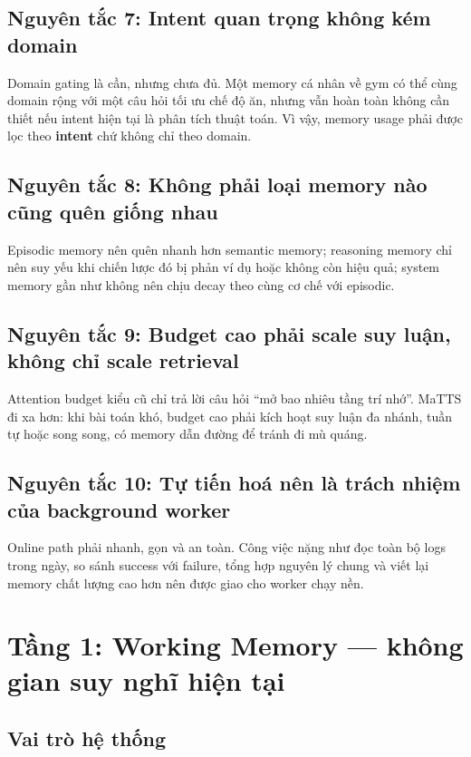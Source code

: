 \documentclass[a4paper,12pt]{article}
\begin{document}
\subsection*{Nguyên tắc 7: Intent quan trọng không kém domain}

Domain gating là cần, nhưng chưa đủ. Một memory cá nhân về gym có thể cùng domain rộng với một câu hỏi tối ưu chế độ ăn, nhưng vẫn hoàn toàn không cần thiết nếu intent hiện tại là phân tích thuật toán. Vì vậy, memory usage phải được lọc theo \textbf{intent} chứ không chỉ theo domain.

\subsection*{Nguyên tắc 8: Không phải loại memory nào cũng quên giống nhau}

Episodic memory nên quên nhanh hơn semantic memory; reasoning memory chỉ nên suy yếu khi chiến lược đó bị phản ví dụ hoặc không còn hiệu quả; system memory gần như không nên chịu decay theo cùng cơ chế với episodic.

\subsection*{Nguyên tắc 9: Budget cao phải scale suy luận, không chỉ scale retrieval}

Attention budget kiểu cũ chỉ trả lời câu hỏi ``mở bao nhiêu tầng trí nhớ''. MaTTS đi xa hơn: khi bài toán khó, budget cao phải kích hoạt suy luận đa nhánh, tuần tự hoặc song song, có memory dẫn đường để tránh đi mù quáng.

\subsection*{Nguyên tắc 10: Tự tiến hoá nên là trách nhiệm của background worker}

Online path phải nhanh, gọn và an toàn. Công việc nặng như đọc toàn bộ logs trong ngày, so sánh success với failure, tổng hợp nguyên lý chung và viết lại memory chất lượng cao hơn nên được giao cho worker chạy nền.

\section{Tầng 1: Working Memory --- không gian suy nghĩ hiện tại}

\subsection*{Vai trò hệ thống}
\end{document}
